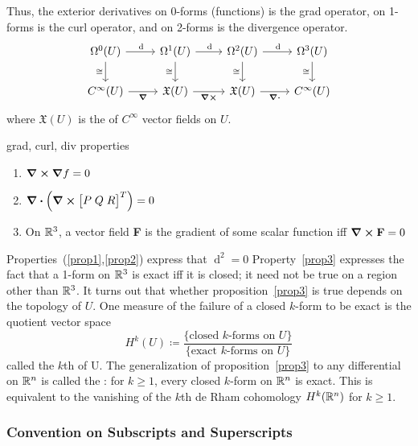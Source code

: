 %
Thus, the exterior derivatives on 0-forms (functions) is the grad operator, on 1-forms is the curl operator, and on 2-forms is the divergence operator.
%
\[
    \begin{tikzcd}
        \Omega^0(U) \arrow{r}{\dif} \arrow[swap]{d}{\cong} & \Omega^1(U) \arrow{r}{\dif} \arrow[swap]{d}{\cong} & \Omega^2(U) \arrow{r}{\dif} \arrow[swap]{d}{\cong} & \Omega^3(U) \arrow[swap]{d}{\cong}  \\
        C^\infty(U) \arrow[swap]{r}{\grad} & \mathfrak{X}(U) \arrow[swap]{r}{\curl} & \mathfrak{X}(U) \arrow[swap]{r}{\div} & C^\infty(U)
    \end{tikzcd}
\]
%
where \(\mathfrak{X}(U)\) is the  of \(C^\infty\) vector fields on \(U\).
%
\begin{proposition}{grad, curl, div properties}{}
    \begin{enumerate}
        \item\label{prop1} \( \curl{\grad{f}} = 0 \)
        \item\label{prop2} \(\div(\curl{ \begin{bmatrix}P \; Q \; R\end{bmatrix} ^T}) = 0\)
        \item\label{prop3} On \(\mathbb{R}^3\), a vector field \textbf{F} is the gradient of some scalar function iff \(\curl{\textbf{F}}=0\)
    \end{enumerate}
\end{proposition}
%
Properties~(\ref{prop1},\ref{prop2}) express that \(\operatorname{d}^2 = 0\)
%
Property~\eqref{prop3} expresses the fact that a 1-form on \(\mathbb{R}^3\) is exact iff it is closed; it need not be true on a region other than \(\mathbb{R}^3\).
%
It turns out that whether proposition~\eqref{prop3} is true depends on the topology of \(U\).
%
One measure of the failure of a closed \(k\)-form to be exact is the quotient vector space 
%
\begin{equation}
    H^k(U) \coloneqq \frac{\{\text{closed \(k\)-forms on } U\}}{\{\text{exact \(k\)-forms on }U\}}
\end{equation}
%
called the \(k\)th  of U.
%
The generalization of proposition~\eqref{prop3} to any differential on \(\mathbb{R}^n\) is called the : for \(k \geq 1\), every closed \(k\)-form on \(\mathbb{R}^n\) is exact.
%
This is equivalent to the vanishing of the \(k\)th de Rham cohomology \(H^k(\mathbb{R}^n)\) for \(k \geq 1\).

\subsubsection{Convention on Subscripts and Superscripts}

